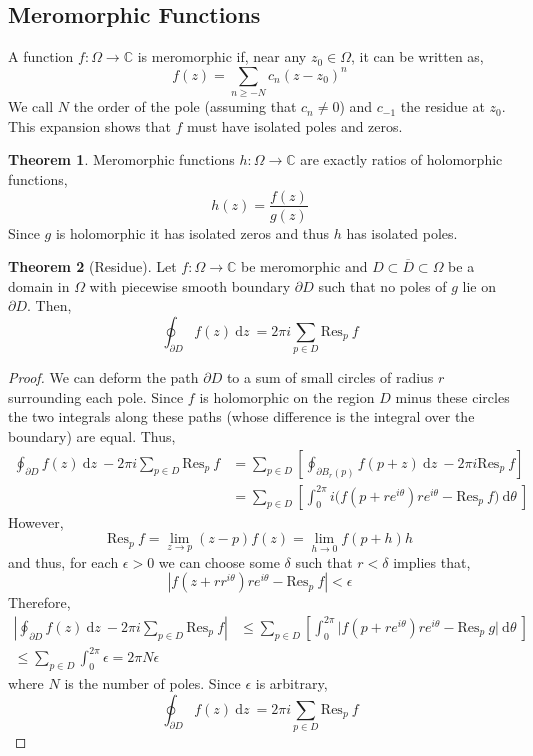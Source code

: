 \documentclass{article}
\newcommand{\C}{\mathbb{C}}
\renewcommand{\d}[1]{\: \mathrm{d}#1 \:}
\theoremstyle{definition}
\newtheorem{theorem}{Theorem}[section]
\newenvironment{definition}[1][Definition:]{\begin{trivlist}
\item[\hskip \labelsep {\bfseries #1}]}{\end{trivlist}}
\newcommand{\Res}[2]{\mathrm{Res}_{#1} \: #2}
\begin{document}
\subsection{Meromorphic Functions}

\begin{definition}
A function $f : \Omega \to \C$ is meromorphic if, near any $z_0 \in \Omega$, it can be written as,
\[ f(z) = \sum_{n \ge - N} c_n (z - z_0)^n \] 
We call $N$ the order of the pole (assuming that $c_n \neq 0$) and $c_{-1}$ the residue at $z_0$. This expansion shows that $f$ must have isolated poles and zeros. 
\end{definition}

\begin{theorem}
Meromorphic functions $h : \Omega \to \C$ are exactly ratios of holomorphic functions,
\[ h(z) = \frac{f(z)}{g(z)} \]
Since $g$ is holomorphic it has isolated zeros and thus $h$ has isolated poles. 
\end{theorem}


\begin{theorem}[Residue]
Let $f : \Omega \to \C$ be meromorphic and $D \subset \overline{D} \subset \Omega$ be a domain in $\Omega$ with piecewise smooth boundary $\partial D$ such that no poles of $g$ lie on $\partial D$. Then,
\[ \oint_{\partial D} f(z) \d{z} = 2 \pi i  \sum_{p \in D} \Res{p} f \]
\end{theorem}

\begin{proof}
We can deform the path $\partial D$ to a sum of small circles of radius $r$ surrounding each pole. Since $f$ is holomorphic on the region $D$ minus these circles the two integrals along these paths (whose difference is the integral over the boundary) are equal. Thus,
\begin{align*}
\oint_{\partial D} f(z) \d{z} - 2 \pi i \sum_{p \in D} \Res{p}{f} & = \sum_{p \in D} \left[ \oint_{\partial B_r(p)}  f(p + z) \d{z}  - 2 \pi i \Res{p}{f}   \right]
\\
& = \sum_{p \in D} \left[ \int_0^{2\pi} i \bigg( f(p + r e^{i\theta}) r e^{i \theta}  - \Res{p}{f} \bigg) \d{\theta}   \right]
\end{align*}
However,
\[ \Res{p}{f} = \lim_{z \to p} (z - p) f(z) = \lim_{h \to 0} f(p + h) h \]
and thus, for each $\epsilon > 0$ we can choose some $\delta$ such that $r < \delta$ implies that,
\[ \left| f(z + r r^{i \theta}) r e^{i \theta} - \Res{p}{f} \right| < \epsilon \]
Therefore,
\begin{align*}
\left| \oint_{\partial D} f(z) \d{z} - 2 \pi i \sum_{p \in D} \Res{p}{f} \right| & \le \sum_{p \in D} \left[ \int_0^{2\pi} \Big| f(p + r e^{i\theta}) r e^{i \theta}  - \Res{p}{g} \Big| \d{\theta}   \right]
\\
\le \sum_{p \in D} \int_0^{2 \pi} \epsilon = 2 \pi N \epsilon 
\end{align*}
where $N$ is the number of poles. Since $\epsilon$ is arbitrary,
\[ \oint_{\partial D} f(z) \d{z} = 2 \pi i \sum_{p \in D} \Res{p}{f} \]
\end{proof}
\end{document}
